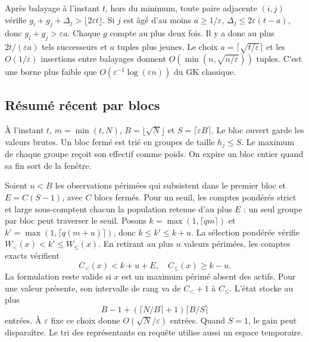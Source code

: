 \documentclass[11pt,a4paper,twocolumn]{article}
\newcommand{\columnbreak}{\newpage}
\begin{document}
Après balayage à l’instant $t$, hors du minimum, toute paire adjacente $(i,j)$ vérifie $g_i+g_j+\Delta_j>\lfloor 2\varepsilon t\rfloor$. Si $j$ est âgé d’au moins $a\ge 1/\varepsilon$, $\Delta_j\le2\varepsilon(t-a)$, donc $g_i+g_j>\varepsilon a$. Chaque $g$ compte au plus deux fois. Il y a donc au plus $2t/(\varepsilon a)$ tels successeurs et $a$ tuples plus jeunes. Le choix $a=\lceil\sqrt{t/\varepsilon}\rceil$ et les $O(1/\varepsilon)$ insertions entre balayages donnent $O(\min(n,\sqrt{n/\varepsilon}))$ tuples. C’est une borne plus faible que $O(\varepsilon^{-1}\log(\varepsilon n))$ du GK classique.
\columnbreak
\subsection{Résumé récent par blocs}
À l’instant $t$, $m=\min(t,N)$, $B=\lfloor\sqrt N\rfloor$ et $S=\lceil\varepsilon B\rceil$. Le bloc ouvert garde les valeurs brutes. Un bloc fermé est trié en groupes de taille $h_j\le S$. Le maximum de chaque groupe reçoit son effectif comme poids. On expire un bloc entier quand sa fin sort de la fenêtre.

Soient $u<B$ les observations périmées qui subsistent dans le premier bloc et $E=C(S-1)$, avec $C$ blocs fermés. Pour un seuil, les comptes pondérés strict et large sous-comptent chacun la population retenue d’au plus $E$ : un seul groupe par bloc peut traverser le seuil. Posons $k=\max(1,\lceil qm\rceil)$ et $k'=\max(1,\lceil q(m+u)\rceil)$, donc $k\leq k'\leq k+u$. La sélection pondérée vérifie $W_{<}(x)<k'\le W_{\le}(x)$. En retirant au plus $u$ valeurs périmées, les comptes exacts vérifient
\begin{equation}
 C_{<}(x)<k+u+E,\quad C_{\le}(x)\ge k-u.
\end{equation}
La formulation reste valide si $x$ est un maximum périmé absent des actifs. Pour une valeur présente, son intervalle de rang va de $C_{<}+1$ à $C_{\le}$. L’état stocke au plus
\begin{equation}
B-1+(\lceil N/B\rceil+1)\lceil B/S\rceil
\end{equation}
entrées. À $\varepsilon$ fixe ce choix donne $O(\sqrt N/\varepsilon)$ entrées. Quand $S=1$, le gain peut disparaître. Le tri des représentants en requête utilise aussi un espace temporaire.
\end{document}

